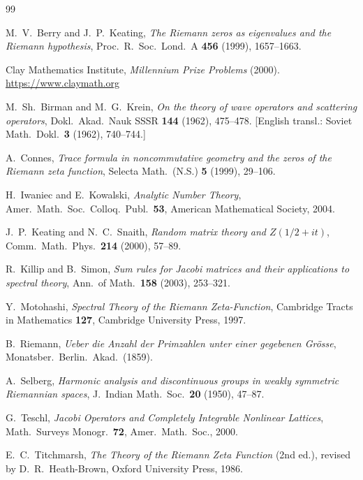 \documentclass{pre-aomart}
\def\zeta{Z}%
\theoremstyle{plain}
\theoremstyle{definition}
\theoremstyle{remark}
\begin{document}
\begin{thebibliography}{99}

M.~V.~Berry and J.~P.~Keating,
\textit{The Riemann zeros as eigenvalues and the Riemann hypothesis},
Proc.\ R.\ Soc.\ Lond.\ A \textbf{456} (1999), 1657--1663.

Clay Mathematics Institute,
\textit{Millennium Prize Problems} (2000).
\url{https://www.claymath.org}

M.~Sh.~Birman and M.~G.~Krein,
\textit{On the theory of wave operators and scattering operators},
Dokl.\ Akad.\ Nauk SSSR \textbf{144} (1962), 475--478.
[English transl.: Soviet Math.\ Dokl.\ \textbf{3} (1962), 740--744.]

A.~Connes,
\textit{Trace formula in noncommutative geometry and the zeros of the Riemann zeta function},
Selecta Math.\ (N.S.) \textbf{5} (1999), 29--106.

H.~Iwaniec and E.~Kowalski,
\textit{Analytic Number Theory},
Amer.\ Math.\ Soc.\ Colloq.\ Publ.\ \textbf{53}, American Mathematical Society, 2004.

J.~P.~Keating and N.~C.~Snaith,
\textit{Random matrix theory and $\zeta(1/2 + it)$},
Comm.\ Math.\ Phys.\ \textbf{214} (2000), 57--89.

R.~Killip and B.~Simon,
\textit{Sum rules for Jacobi matrices and their applications to spectral theory},
Ann.\ of Math.\ \textbf{158} (2003), 253--321.

Y.~Motohashi,
\textit{Spectral Theory of the Riemann Zeta-Function},
Cambridge Tracts in Mathematics \textbf{127}, Cambridge University Press, 1997.

B.~Riemann,
\textit{Ueber die Anzahl der Primzahlen unter einer gegebenen Gr\"osse},
Monatsber.\ Berlin.\ Akad.\ (1859).

A.~Selberg,
\textit{Harmonic analysis and discontinuous groups in weakly symmetric Riemannian spaces},
J.\ Indian Math.\ Soc.\ \textbf{20} (1950), 47--87.

G.~Teschl,
\textit{Jacobi Operators and Completely Integrable Nonlinear Lattices},
Math.\ Surveys Monogr.\ \textbf{72}, Amer.\ Math.\ Soc., 2000.

E.~C.~Titchmarsh,
\textit{The Theory of the Riemann Zeta Function} (2nd ed.),
revised by D.\ R.\ Heath-Brown, Oxford University Press, 1986.


\end{thebibliography}
\end{document}
